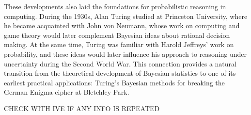 These developments also laid the foundations for probabilistic reasoning in computing. During the 1930s, Alan Turing studied at Princeton University, where he became acquainted with John von Neumann, whose work on computing and game theory would later complement Bayesian ideas about rational decision making. At the same time, Turing was familiar with Harold Jeffreys' work on probability, and these ideas would later influence his approach to reasoning under uncertainty during the Second World War. This connection provides a natural transition from the theoretical development of Bayesian statistics to one of its earliest practical applications: Turing's Bayesian methods for breaking the German Enigma cipher at Bletchley Park.

CHECK WITH IVE IF ANY INFO IS REPEATED










